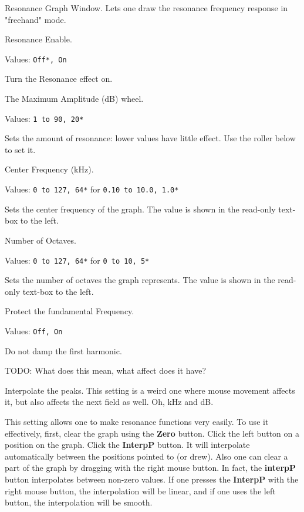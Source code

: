    Resonance Graph Window.
   Lets one draw the resonance frequency response in "freehand" mode.

   Resonance Enable.

   Values: \texttt{Off*, On}

   Turn the Resonance effect on.

   The Maximum Amplitude (dB) wheel.

   Values: \texttt{1 to 90, 20*}

   Sets the amount of resonance: lower values have little effect. Use the
   roller below to set it. 

   Center Frequency (kHz).

   Values: \texttt{0 to 127, 64*} for \texttt{0.10 to 10.0, 1.0*}

   Sets the center frequency of the graph.
   The value is shown in the read-only text-box to the left.

   Number of Octaves.

   Values: \texttt{0 to 127, 64*} for \texttt{0 to 10, 5*}

   Sets the number of octaves the graph represents.
   The value is shown in the read-only text-box to the left.

   Protect the fundamental Frequency.

   Values: \texttt{Off, On}

   Do not damp the first harmonic.

   TODO:  What does this mean, what affect does it have?

   Interpolate the peaks.
   This setting is a weird one where mouse movement affects it,
   but also affects the next field as well.  Oh, kHz and dB.

   This setting allows one to make resonance functions very easily.  To use
   it effectively, first, clear the graph using the \textbf{Zero} button.
   Click the left button on a position on the graph. Click the
   \textbf{InterpP} button. It will interpolate automatically between the
   positions pointed to (or drew).  Also one can clear a part of the graph
   by dragging with the right mouse button. In fact, the \textbf{interpP}
   button interpolates between non-zero values.  If one presses the
   \textbf{InterpP} with the right mouse button, the interpolation will be
   linear, and if one uses the left button, the interpolation will be
   smooth. 

